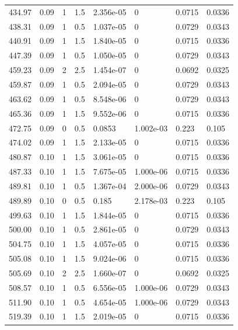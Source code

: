 \documentclass[preview]{standalone}
\begin{document}
{{{\begin{tabular}{L{1.2cm}C{1.2cm} C{0.3cm}C{0.5cm} C{1.4cm}C{1.4cm} C{1.4cm}C{1.4cm}}
  434.97  &  0.09  & 1     & 1.5 &  2.356e-05  & 0  & 0.0715 &  0.0336   \\ 
  438.31  &  0.09  & 1     & 0.5 &  1.037e-05  & 0  & 0.0729 &  0.0343   \\ 
  440.91  &  0.09  & 1     & 1.5 &  1.840e-05  & 0  & 0.0715 &  0.0336   \\ 
  447.39  &  0.09  & 1     & 0.5 &  1.050e-05  & 0  & 0.0729 &  0.0343   \\ 
  459.23  &  0.09  & 2     & 2.5 &  1.454e-07  & 0  & 0.0692 &  0.0325   \\ 
  459.87  &  0.09  & 1     & 0.5 &  2.094e-05  & 0  & 0.0729 &  0.0343   \\ 
  463.62  &  0.09  & 1     & 0.5 &  8.548e-06  & 0  & 0.0729 &  0.0343   \\ 
  465.36  &  0.09  & 1     & 1.5 &  9.552e-06  & 0  & 0.0715 &  0.0336   \\ 
  472.75  &  0.09  & 0     & 0.5 &  0.0853  & 1.002e-03  & 0.223 &  0.105   \\ 
  474.02  &  0.09  & 1     & 1.5 &  2.133e-05  & 0  & 0.0715 &  0.0336   \\ 
  480.87  &  0.10  & 1     & 1.5 &  3.061e-05  & 0  & 0.0715 &  0.0336   \\ 
  487.33  &  0.10  & 1     & 1.5 &  7.675e-05  & 1.000e-06  & 0.0715 &  0.0336   \\ 
  489.81  &  0.10  & 1     & 0.5 &  1.367e-04  & 2.000e-06  & 0.0729 &  0.0343   \\ 
  489.89  &  0.10  & 0     & 0.5 &  0.185  & 2.178e-03  & 0.223 &  0.105   \\ 
  499.63  &  0.10  & 1     & 1.5 &  1.844e-05  & 0  & 0.0715 &  0.0336   \\ 
  500.00  &  0.10  & 1     & 0.5 &  2.861e-05  & 0  & 0.0729 &  0.0343   \\ 
  504.75  &  0.10  & 1     & 1.5 &  4.057e-05  & 0  & 0.0715 &  0.0336   \\ 
  505.08  &  0.10  & 1     & 1.5 &  9.024e-06  & 0  & 0.0715 &  0.0336   \\ 
  505.69  &  0.10  & 2     & 2.5 &  1.660e-07  & 0  & 0.0692 &  0.0325   \\ 
  508.57  &  0.10  & 1     & 0.5 &  6.556e-05  & 1.000e-06  & 0.0729 &  0.0343   \\ 
  511.90  &  0.10  & 1     & 0.5 &  4.654e-05  & 1.000e-06  & 0.0729 &  0.0343   \\ 
  519.39  &  0.10  & 1     & 1.5 &  2.019e-05  & 0  & 0.0715 &  0.0336   \\ 

\end{tabular}}}}
\end{document}
